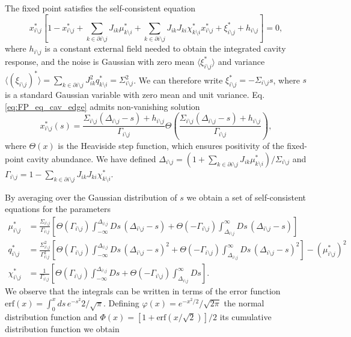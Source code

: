 \documentclass[
    preprint,
    linenumbers,
    amsmath,amssymb,amsfonts,
    aps, physrev,
    superscriptaddress,
    10pt,
    bibnotes
    ]{revtex4-2}
\newcommand{\erf}{\text{erf}}
\begin{document}
The fixed point satisfies the self-consistent equation 
\begin{equation}
x_{i\setminus j}^{*}\left[1-x_{i\setminus j}^{*}+\sum_{k\in\partial i \setminus j}J_{ik}\mu_{k \setminus i}^{*}+\sum_{k\in\partial i \setminus j}J_{ik}J_{ki}\chi_{k \setminus i}^{*}x_{i \setminus j}^{*}+\xi_{i \setminus j}^{*}+h_{i \setminus j}\right]=0,\label{eq:FP_eq_cav_edge}
\end{equation}
where $h_{i \setminus j}$ is a constant external field needed to obtain the integrated cavity response, and the noise is Gaussian with zero mean $\langle \xi_{i\setminus j}^*\rangle$ and variance $\langle (\xi_{i\setminus j})^*\rangle=\sum_{k\in\partial i\setminus j}J_{ik}^2q_{k\setminus i}^*=\Sigma_{i\setminus j}^2$. We can therefore write $\xi_{i\setminus j}^*=-\Sigma_{i\setminus j}s$, where $s$ is a standard Gaussian variable with zero mean and unit variance. Eq. \eqref{eq:FP_eq_cav_edge} admits non-vanishing solution
\begin{equation}
x_{i\setminus j}^{*}\left(s\right)=\frac{\Sigma_{i\setminus j}(\Delta_{i\setminus j}-s)+h_{i\setminus j}}{\Gamma_{i\setminus j}}\Theta\left(\frac{\Sigma_{i\setminus j}(\Delta_{i\setminus j}-s)+h_{i\setminus j}}{\Gamma_{i\setminus j}}\right),\label{eq:FP_sol_cavity}
\end{equation}
where $\Theta(x)$ is the Heaviside step function, which ensures positivity of the fixed-point cavity abundance. We have defined $\Delta_{i\setminus j}=(1+\sum_{k\in\partial i \setminus j}J_{ik}\mu_{k \setminus i}^{*})/\Sigma_{i\setminus j}$ and $\Gamma_{i\setminus j}=1-\sum_{k\in\partial i \setminus j}J_{ik}J_{ki}\chi_{k \setminus i}^{*}$.

By averaging over the Gaussian distribution of $s$ we obtain a set of self-consistent equations for the parameters
\begin{subequations}
\begin{align}
\mu_{i\setminus j}^*&=\frac{\Sigma_{i\setminus j}}{\Gamma_{i\setminus j}}\left[\Theta(\Gamma_{i\setminus j})\int_{-\infty}^{\Delta_{i\setminus j}}Ds\,(\Delta_{i\setminus j}-s)+\Theta(-\Gamma_{i\setminus j})\int_{\Delta_{i\setminus j}}^{\infty}Ds\,(\Delta_{i\setminus j}-s)\right]\\
q_{i\setminus j}^*&=\frac{\Sigma^2_{i\setminus j}}{\Gamma^2_{i\setminus j}}\left[\Theta(\Gamma_{i\setminus j})\int_{-\infty}^{\Delta_{i\setminus j}}Ds\,(\Delta_{i\setminus j}-s)^2+\Theta(-\Gamma_{i\setminus j})\int_{\Delta_{i\setminus j}}^{\infty}Ds\,(\Delta_{i\setminus j}-s)^2\right] - \left(\mu_{i\setminus j}^{*}\right)^2\\
\chi_{i\setminus j}^*&=\frac{1}{\Gamma_{i\setminus j}}\left[\Theta(\Gamma_{i\setminus j})\int_{-\infty}^{\Delta_{i\setminus j}}Ds+\Theta(-\Gamma_{i\setminus j})\int_{\Delta_{i\setminus j}}^{\infty}Ds\right].
\end{align}
\end{subequations}
We observe that the integrals can be written in terms of the error function $\erf(x)=\int_0^{x} ds\,e^{-s^2}2/\sqrt{\pi}$. Defining $\varphi(x)=e^{-x^2/2}/\sqrt{2\pi}$ the normal distribution function and $\Phi(x)=[1+\erf(x/\sqrt{2})]/2$ its cumulative distribution function we obtain
\end{document}
